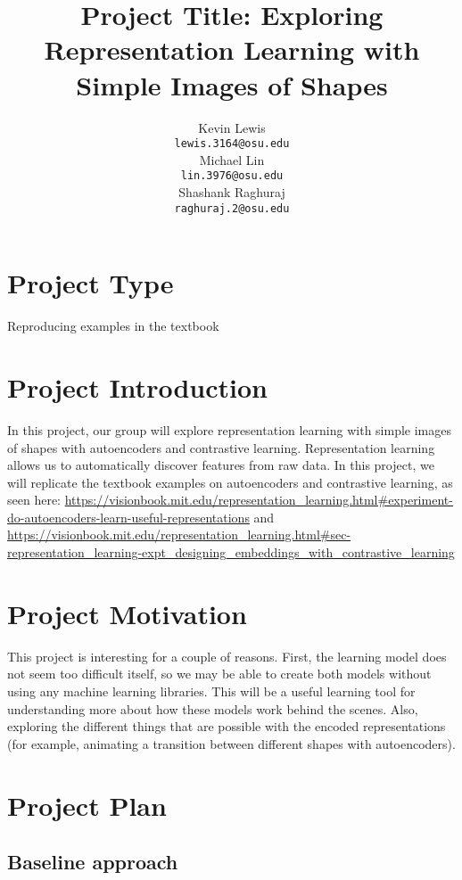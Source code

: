 \documentclass{article}
\title{Project Title: Exploring Representation Learning with Simple Images of Shapes}
\author{%
  Kevin Lewis\\
  \texttt{lewis.3164@osu.edu} \\
  \And
  Michael Lin\\
  \texttt{lin.3976@osu.edu} \\
    \And
  Shashank Raghuraj\\
  \texttt{raghuraj.2@osu.edu} \\
}
\begin{document}
\maketitle



\section{Project Type}
Reproducing examples in the textbook

\section{Project Introduction}
{\color{black}
In this project, our group will explore representation learning with simple images of shapes with autoencoders and contrastive learning. Representation learning allows us to automatically discover features from raw data.
In this project, we will replicate the textbook examples on autoencoders and contrastive learning, as seen here: 
\url{https://visionbook.mit.edu/representation_learning.html#experiment-do-autoencoders-learn-useful-representations}
and 
\url{https://visionbook.mit.edu/representation_learning.html#sec-representation_learning-expt_designing_embeddings_with_contrastive_learning}
} 


\section{Project Motivation}

This project is interesting for a couple of reasons. First, the learning model does not seem too difficult itself, so we may be able to create both models without using any machine learning libraries.  This will be a useful learning tool for understanding more about how these models work behind the scenes.  Also, exploring the different things that are possible with the encoded representations (for example, animating a transition between different shapes with autoencoders).

\section{Project Plan}
\subsection{Baseline approach}
\end{document}
